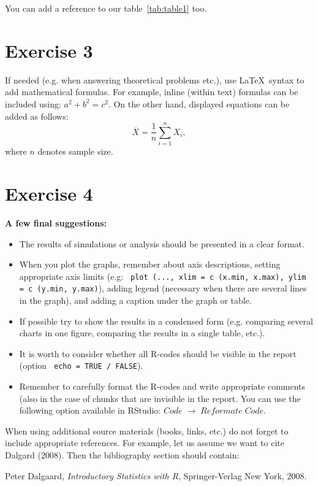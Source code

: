 \documentclass[12pt, a4paper]{article}\usepackage[]{graphicx}\usepackage[]{color}
\begin{document}
You can add a reference to our table~\ref{tab:table1} too.


\section{Exercise 3}

If needed (e.g. when answering theoretical problems etc.), use \LaTeX \ syntax to add mathematical formulas. For example, inline (within text) formulas can be included using: $a^2+b^2=c^2$. On the other hand, 	displayed equations can be added as follows:
\begin{equation}
\label{eq:wzor1}
\overline{X} = \frac{1}{n}\sum_{i=1}^n X_i,
\end{equation}
where $n$ denotes sample size.


\section{Exercise 4}

{\bf A few final suggestions:}
\begin{itemize}
\item The results of simulations or analysis should be presented in a clear format.
\item When you plot the graphs, remember about axis descriptions, setting appropriate axis limits (e.g: \verb+ plot (..., xlim = c (x.min, x.max), ylim = c (y.min, y.max)+), adding legend (necessary when there are several lines in the graph), and adding a caption under the graph or table.
\item If possible try to show the results in a condensed form (e.g. comparing several charts in one figure, comparing the results in a single table, etc.).

\item It is worth to consider whether all R-codes should be visible in the report (option {\verb+ echo = TRUE / FALSE+}).

\item Remember to carefully format the R-codes and write appropriate comments (also in the case of chunks that are invisible in the report. You can use the following option available in RStudio: $Code \; \rightarrow\; Reformate \;  Code$.
\end{itemize}

When using additional source materials (books, links, etc.)
do not forget to include appropriate references.  For example, let us assume 
we want to cite Dalgard (2008). Then the bibliography section should contain:

\begin{thebibliography}{}
 
  Peter Dalgaard, \emph{Introductory Statistics with R}, Springer-Verlag New York, 2008.

\end{thebibliography}
\end{document}
